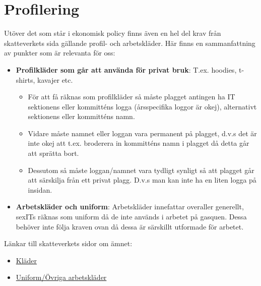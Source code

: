 \documentclass{article}
\begin{document}

\section{Profilering}
Utöver det som står i ekonomisk policy finns även en hel del krav från skatteverkets sida gällande profil- och arbetskläder. Här finns en sammanfattning av punkter som är relevanta för oss:
\begin{itemize}
    \item \textbf{Profilkläder som går att använda för privat bruk}: T.ex. hoodies, t-shirts, kavajer etc.
    \begin{itemize}
        \item För att få räknas som profilkläder så måste plagget antingen ha IT sektionens eller kommitténs logga (årsspecifika loggor är okej), alternativt sektionens eller kommitténs namn.
        \item Vidare måste namnet eller loggan vara permanent på plagget, d.v.s det är inte okej att t.ex. broderera in kommitténs namn i plagget då detta går att sprätta bort.
        \item Dessutom så måste loggan/namnet vara tydligt synligt så att plagget går att särskilja från ett privat plagg. D.v.s man kan inte ha en liten logga på insidan.
    \end{itemize}
    \item \textbf{Arbetskläder och uniform}: Arbetskläder innefattar overaller generellt, sexITs räknas som uniform då de inte används i arbetet på gasquen. Dessa behöver inte följa kraven ovan då dessa är särskillt utformade för arbetet.
\end{itemize}

Länkar till skatteverkets sidor om ämnet:
\begin{itemize}
    \item \href{https://www4.skatteverket.se/rattsligvagledning/324001.html}{Kläder}
    \item \href{https://www.skatteverket.se/privat/skatter/arbeteochinkomst/formaner/arbetsklader.4.7459477810df5bccdd480008466.html}{Uniform/Övriga arbetskläder}
\end{itemize}
\end{document}
